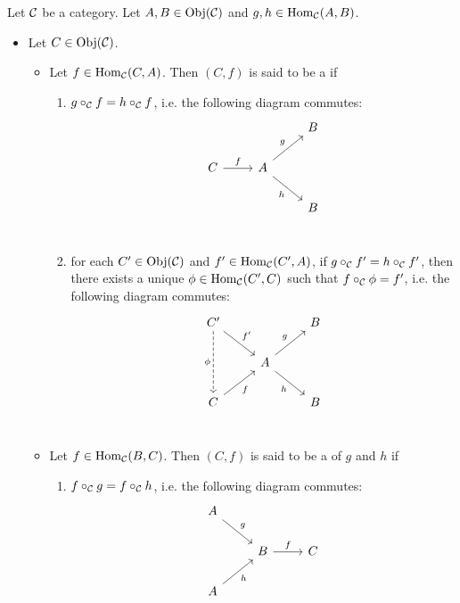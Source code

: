 \documentclass{book}
\begin{document}
	\begin{defn}
		Let $\mathcal{C}$ be a category. Let $A,B \in \operatorname{Obj}(\mathcal{C})$ and $g,h \in \operatorname{Hom}_{\mathcal{C}}(A,B)$. 
		\begin{itemize}
			\item Let $C \in \operatorname{Obj}(\mathcal{C})$.
			\begin{itemize}
				\item Let $f \in \operatorname{Hom}_{\mathcal{C}}(C, A)$. Then $(C, f)$ is said to be a  if 
				\begin{enumerate}
					\item $g \circ_{\mathcal{C}} f = h \circ_{\mathcal{C}} f$, i.e. the following diagram commutes:
					\[ 
					\begin{tikzcd}[baseline= 7]
						&                                   & B \\
						C \arrow[r, "f"]  & A \arrow[ur, "g"] \arrow[dr, "h"'] &   \\
						&                                   & B \\
					\end{tikzcd}
					\]
					\item for each $C' \in \operatorname{Obj}(\mathcal{C})$ and $f' \in \operatorname{Hom}_{\mathcal{C}}(C', A)$, if $g \circ_{\mathcal{C}} f' = h \circ_{\mathcal{C}} f'$, then there exists a unique $\phi \in \operatorname{Hom}_{\mathcal{C}}(C', C)$ such that $f \circ_{\mathcal{C}} \phi = f'$, i.e. the following diagram commutes:
					\[ 
					\begin{tikzcd}[baseline= 7]
						C' \arrow[dr, "f'"] \arrow[dd, "\phi"', dashed]&     & B \\
						& A \arrow[ur, "g"] \arrow[dr, "h"'] &   \\
						C \arrow[ur, "f"'] &                                  & B \\
					\end{tikzcd}
					\]
				\end{enumerate} 
				\item Let $f \in \operatorname{Hom}_{\mathcal{C}}(B, C)$. Then $(C, f)$ is said to be a  of $g$ and $h$ if 
				\begin{enumerate}
					\item $f \circ_{\mathcal{C}} g = f \circ_{\mathcal{C}} h$, i.e. the following diagram commutes:
					\[ 
					\begin{tikzcd}[baseline= 7]
						A \arrow[dr, "g"]  &                   &  \\
						& B \arrow[r, "f"]  & C  \\
						A \arrow[ur, "h"']  &                   & \\
					\end{tikzcd}
\]
\end{enumerate}
\end{itemize}
\end{itemize}
\end{defn}
\end{document}
